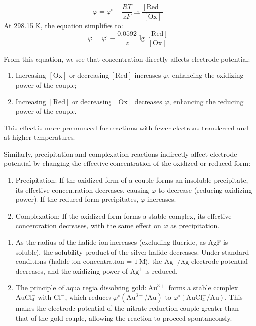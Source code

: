 \begin{proposition}
$$\varphi = \varphi^\circ - \frac{RT}{zF}\ln\frac{[\text{Red}]}{[\text{Ox}]}$$
At 298.15 K, the equation simplifies to:
$$\varphi = \varphi^\circ - \frac{0.0592}{z}\lg\frac{[\text{Red}]}{[\text{Ox}]}$$

From this equation, we see that concentration directly affects electrode potential:
\begin{enumerate}
    \item Increasing $[\text{Ox}]$ or decreasing $[\text{Red}]$ increases $\varphi$, enhancing the oxidizing power of the couple;
    \item Increasing $[\text{Red}]$ or decreasing $[\text{Ox}]$ decreases $\varphi$, enhancing the reducing power of the couple.
\end{enumerate}
This effect is more pronounced for reactions with fewer electrons transferred and at higher temperatures.
\end{proposition}

Similarly, precipitation and complexation reactions indirectly affect electrode potential by changing the effective concentration of the oxidized or reduced form:

\begin{proposition}
\begin{enumerate}
    \item Precipitation: If the oxidized form of a couple forms an insoluble precipitate, its effective concentration decreases, causing $\varphi$ to decrease (reducing oxidizing power). If the reduced form precipitates, $\varphi$ increases.
    \item Complexation: If the oxidized form forms a stable complex, its effective concentration decreases, with the same effect on $\varphi$ as precipitation.
\end{enumerate}
\end{proposition}

\begin{example}
  \begin{enumerate}
    \item As the radius of the halide ion increases (excluding fluoride, as AgF is soluble), the solubility product of the silver halide decreases. Under standard conditions (halide ion concentration = $1\ \mathrm{M}$), the $\text{Ag}^+/\text{Ag}$ electrode potential decreases, and the oxidizing power of $\text{Ag}^+$ is reduced.
    \item The principle of aqua regia dissolving gold: $\text{Au}^{3+}$ forms a stable complex $\text{AuCl}_4^-$ with $\text{Cl}^-$, which reduces $\varphi^\circ(\text{Au}^{3+}/\text{Au})$ to $\varphi^\circ(\text{AuCl}_4^-/\text{Au})$. This makes the electrode potential of the nitrate reduction couple greater than that of the gold couple, allowing the reaction to proceed spontaneously.
  \end{enumerate}
\end{example}

